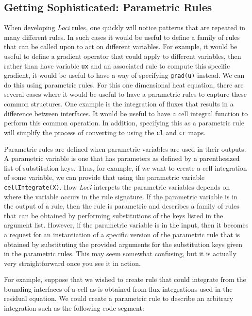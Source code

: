 \documentclass[10pt,epsf]{book}
\begin{document}
\subsection{Getting Sophisticated: Parametric Rules}

When developing {\it Loci} rules, one quickly will notice patterns that are
repeated in many different rules.  In such cases it would be useful to
define a family of rules that can be called upon to act on different
variables.  For example, it would be useful to define a gradient
operator that could apply to different variables, then rather than
have variable {\tt ux} and an associated rule to compute this specific
gradient, it would be useful to have a way of specifying {\tt grad(u)}
instead.  We can do this using parametric rules.  For this one
dimensional heat equation, there are several cases where it would be
useful to have a parametric rules to capture these common structures.
One example is the integration of fluxes that results in a difference
between interfaces.  It would be useful to have a cell integral
function to perform this common operation.  In addition, specifying
this as a parametric rule will simplify the process of converting to
using the {\tt cl} and {\tt cr} maps.  

Parametric rules are defined when parametric variables are used in
their outputs.  A parametric variable is one that has parameters as
defined by a parenthesized list of substitution keys.  Thus, for
example, if we want to create a cell integration of some variable, we
can provide that using the parametric variable {\tt cellIntegrate(X)}.
How {\it Loci} interpets the parametric variables depends on where the
variable occurs in the rule signature.  If the parametric variable is
in the output of a rule, then the rule is parametric and describes a
family of rules that can be obtained by performing substitutions of
the keys listed in the argument list.  However, if the parametric
variable is in the input, then it becomes a request for an
instantiation of a specific version of the parametric rule that is
obtained by substituting the provided arguments for the substitution
keys given in the parametric rules.  This may seem somewhat confusing,
but it is actually very straightforward once you see it in action.

For example, suppose that we wished to create rule that could
integrate from the bounding interfaces of a cell as is obtained from
flux integrations used in the residual equation.  We could create a
parametric rule to describe an arbitrary integration such as the
following code segment:
\end{document}
